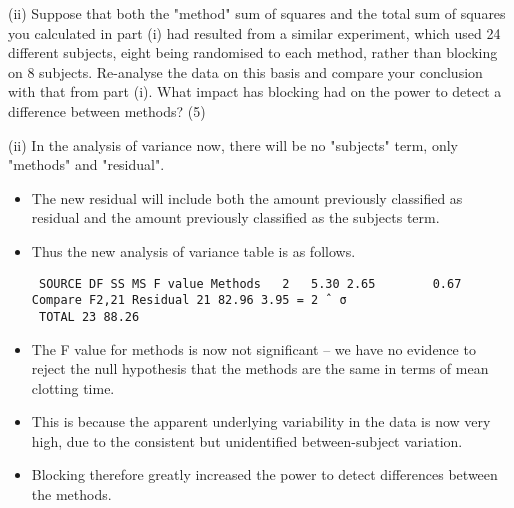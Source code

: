 \documentclass[a4paper,12pt]{article}
\begin{document}
\newpage
\begin{framed}
 (ii) Suppose that both the "method" sum of squares and the total sum of squares you calculated in part (i) had resulted from a similar experiment, which used 24 different subjects, eight being randomised to each method, rather than blocking on 8 subjects.  Re-analyse the data on this basis and compare your conclusion with that from part (i).  What impact has blocking had on the power to detect a difference between methods? (5) 

\end{framed}
 
 
 
(ii) In the analysis of variance now, there will be no "subjects" term, only "methods" and "residual". 

\begin{itemize}
    \item The new residual will include both the amount previously classified as residual and the amount previously classified as the subjects term.  
    \item Thus the new analysis of variance table is as follows. 
\begin{verbatim}    
 SOURCE DF SS MS F value Methods   2   5.30 2.65        0.67   Compare F2,21 Residual 21 82.96 3.95 = 2 ˆ σ
 TOTAL 23 88.26   
\end{verbatim} 
\item  The F value for methods is now not significant  –  we have no evidence to reject the null hypothesis that the methods are the same in terms of mean clotting time.  
\item This is because the apparent underlying variability in the data is now very high, due to the consistent but unidentified between-subject variation.  
\item Blocking therefore greatly increased the power to detect differences between the methods. 
\end{itemize}
 
 
\end{document}
